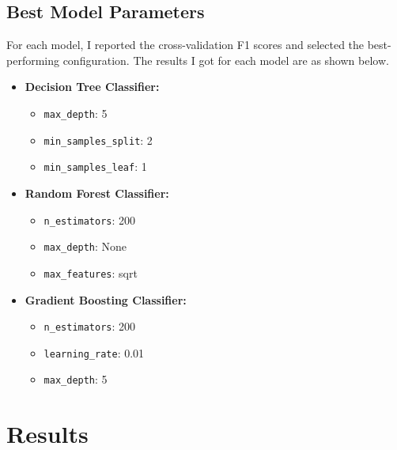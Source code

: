 \documentclass[12pt]{article}
\begin{document}
\subsection*{Best Model Parameters}
For each model, I reported the cross-validation F1 scores and selected the best-performing configuration. The results I got for each model are as shown below.
\begin{itemize}
    \item \textbf{Decision Tree Classifier:}
    \begin{itemize}
        \item \texttt{max\_depth}: 5 %
        \item \texttt{min\_samples\_split}: 2 %
        \item \texttt{min\_samples\_leaf}:  1 %
    \end{itemize}
    \item \textbf{Random Forest Classifier:}
    \begin{itemize}
        \item \texttt{n\_estimators}: 200%
        \item \texttt{max\_depth}: None %
        \item \texttt{max\_features}: sqrt %
    \end{itemize}
    \item \textbf{Gradient Boosting Classifier:}
    \begin{itemize}
        \item \texttt{n\_estimators}: 200 %
        \item \texttt{learning\_rate}:  0.01%
        \item \texttt{max\_depth}:  5%
    \end{itemize}
\end{itemize}

\section{Results}
\end{document}
